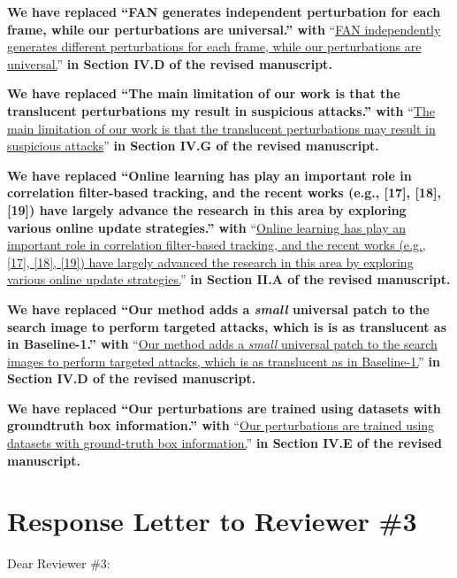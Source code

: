 \documentclass[12pt]{article}
\begin{document}
\textbf{We have replaced ``FAN generates independent perturbation for each frame, while our perturbations are universal.'' with} ``\uline{FAN independently generates different perturbations for each frame, while our perturbations are universal.}'' \textbf{in Section IV.D of the revised manuscript.}

\textbf{We have replaced ``The main limitation of our work is that the translucent perturbations my result in suspicious attacks.'' with} ``\uline{The main limitation of our work is that the translucent perturbations may result in suspicious attacks}'' \textbf{in Section IV.G of the revised manuscript.}

\textbf{We have replaced ``Online learning has play an important role in correlation filter-based tracking, and the recent works (e.g., [17], [18], [19]) have largely advance the research in this area by exploring various online update strategies.'' with} ``\uline{Online learning has play an important role in correlation filter-based tracking, and the recent works (e.g., [17], [18], [19]) have largely advanced the research in this area by exploring various online update strategies.}'' \textbf{in Section II.A of the revised manuscript.}

\textbf{We have replaced ``Our method adds a \textit{small} universal patch to the search image to perform targeted attacks, which is is as translucent as in Baseline-1.'' with} ``\uline{Our method adds a \textit{small} universal patch to the search images to perform targeted attacks, which is as translucent as in Baseline-1.}'' \textbf{in Section IV.D of the revised manuscript.}

\textbf{We have replaced ``Our perturbations are trained using datasets with groundtruth box information.'' with} ``\uline{Our perturbations are trained using datasets with ground-truth box information.}'' \textbf{in Section IV.E of the revised manuscript.}

\clearpage
\newpage
{\centering\section*{Response Letter to Reviewer \#3}}
\noindent Dear Reviewer \#3:
\end{document}
